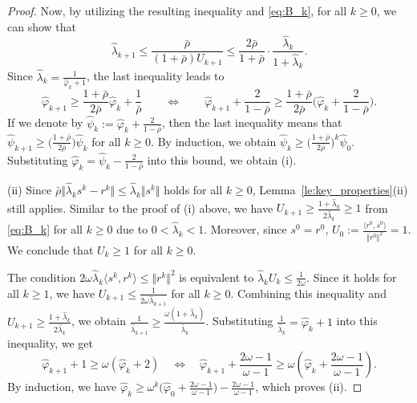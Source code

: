\documentclass{article}
\theoremstyle{plain}
\theoremstyle{definition}
\newcommand{\norms}[1]{\Vert#1\Vert}
\newcommand{\iprods}[1]{\langle #1\rangle}
\newcommand{\0}{\boldsymbol{0}}
\begin{document}
\begin{proof}
Now, by utilizing the resulting inequality and \eqref{eq:B_k}, for all $k \geq 0$, we can show that
\begin{equation*} 
\hat{\lambda}_{k+1} \leq \frac{\bar{\rho}}{(1 + \bar{\rho})U_{k+1}} \leq \frac{2\bar{\rho}}{1 + \bar{\rho}} \cdot \frac{\hat{\lambda}_k}{1 + \hat{\lambda}_k}.  
\end{equation*}
Since $\hat{\lambda}_k = \frac{1}{\hat{\varphi}_k + 1}$, the last inequality leads to 
\begin{equation*}
\hat{\varphi}_{k+1} \geq \frac{1 + \bar{\rho} }{2 \bar{\rho} }\hat{\varphi}_k + \frac{1}{ \bar{\rho}} 
\qquad\Leftrightarrow \qquad 
\hat{\varphi}_{k+1} + \frac{2}{1 - \bar{\rho}} \geq \frac{1 + \bar{\rho}}{2\bar{\rho}}\Big(\hat{\varphi}_k + \frac{2}{1 - \bar{\rho} }\Big).
\end{equation*}
If we denote by $\hat{\psi}_k := \hat{\varphi}_k + \frac{2}{1 - \bar{\rho}}$, then the last inequality means that $\hat{\psi}_{k+1} \geq \big(\frac{1 + \bar{\rho}}{2\bar{\rho}} \big) \hat{\psi}_k$ for all $k\geq 0$.
By induction, we obtain $\hat{\psi}_k \geq \big(\frac{1 + \bar{\rho}}{2\bar{\rho}}\big)^k \hat{\psi}_0$.
Substituting $\hat{\varphi}_k = \hat{\psi}_k - \frac{2}{1 - \bar{\rho} }$ into this bound, we obtain (i).

(ii) 
Since $\bar{\rho} \norms{\hat{\lambda}_ks^k - r^k}  \leq \hat{\lambda}_k\norms{s^k}$ holds for all $k \geq 0$, Lemma~\ref{le:key_properties}(ii) still applies.
Similar to the proof of (i) above, we have $U_{k+1} \geq \frac{1 + \hat{\lambda}_k}{2\hat{\lambda}_k} \geq 1$ from \eqref{eq:B_k} for all $k \geq 0$ due to $0 < \hat{\lambda}_k < 1$.
Moreover,  since $s^0 = r^0$, $U_0 := \frac{\iprods{r^0, s^0}}{\norms{r^0}^2} = 1$.
We conclude that $U_k \geq 1$ for all $k \geq 0$.

The condition $2\omega\hat{\lambda}_k\iprods{s^k, r^k} \leq \norms{r^k}^2$ is equivalent to $\hat{\lambda}_kU_k \leq \frac{1}{2\omega}$.
Since it holds for all $k \geq 1$, we have $U_{k+1} \leq \frac{1}{2\omega\hat{\lambda}_{k+1}}$ for all $k \geq 0$.
Combining this inequality and $U_{k+1} \geq \frac{1 + \hat{\lambda}_k}{2\hat{\lambda}_k}$, we obtain $\frac{1}{\hat{\lambda}_{k+1}} \geq \frac{\omega(1 + \hat{\lambda}_k)}{\hat{\lambda}_k}$.
Substituting $\frac{1}{\hat{\lambda}_k} = \hat{\varphi}_k + 1$ into this inequality, we get
\begin{equation*}
\hat{\varphi}_{k+1} + 1 \geq \omega(\hat{\varphi}_k + 2) \quad \Leftrightarrow \quad \hat{\varphi}_{k+1} + \frac{2\omega-1}{\omega - 1} \geq \omega\left(\hat{\varphi}_k +  \frac{2\omega-1}{\omega - 1} \right).
\end{equation*}
By induction, we have $\hat{\varphi}_k \geq \omega^k\big(\hat{\varphi}_0 + \frac{2\omega-1}{\omega-1}\big) -  \frac{2\omega-1}{\omega - 1}$, which proves (ii).
\end{proof}
\end{document}
